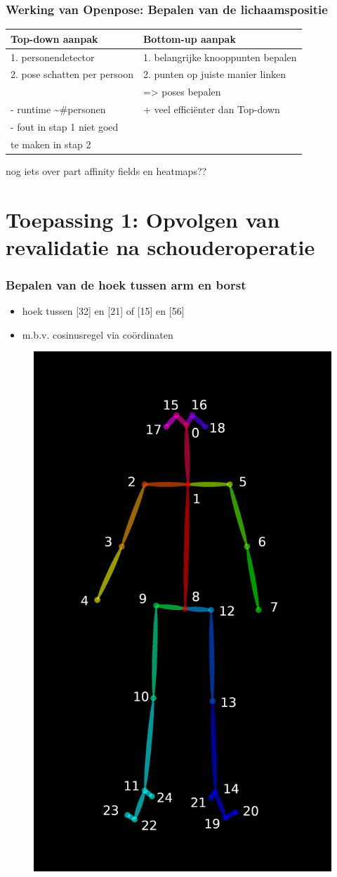 \documentclass
   [kulak] %
   {kulakbeamer}
\begin{document}
\begin{frame}
\frametitle{Werking van Openpose: Bepalen van de lichaamspositie}

\begin{center}
	\begin{tabular}{l|l} 
		\textbf{Top-down aanpak} & \textbf{Bottom-up aanpak}\\
		\hline
		1. personendetector & 1. belangrijke knooppunten bepalen\\
		2. pose schatten per persoon & 2. punten op juiste manier linken\\
		& => poses bepalen\\
		\hline
		- runtime \textasciitilde \#personen  & + veel efficiënter dan Top-down\\
		- fout in stap 1 niet goed  & \\
		 te maken in stap 2 & \\
	\end{tabular}
\end{center}
\end{frame}

\begin{frame}
	nog iets over part affinity fields en heatmaps??
\end{frame}

\section{Toepassing 1: Opvolgen van revalidatie na schouderoperatie}

\begin{frame}
\frametitle{Bepalen van de hoek tussen arm en borst}
\begin{itemize}
	\item hoek tussen [32] en [21] of [15] en [56]
	\item m.b.v. cosinusregel via coördinaten
\end{itemize}
\begin{figure}
	\centering
	\includegraphics[width= .3\textwidth]{HPE_skelet}
\end{figure}
\end{frame}
\end{document}

